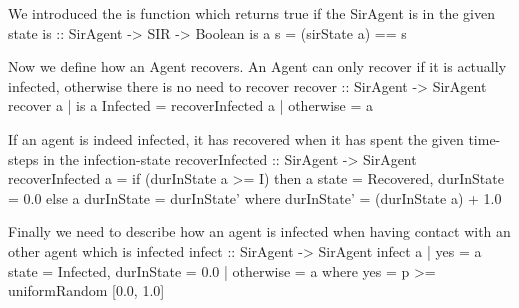 We introduced the is function which returns true if the SirAgent is in the given state
is :: SirAgent -> SIR -> Boolean
is a s = (sirState a) == s 

Now we define how an Agent recovers. An Agent can only recover if it is actually infected, otherwise there is no need to recover
recover :: SirAgent -> SirAgent
recover a 
	| is a Infected = recoverInfected a
	| otherwise 	= a
	
If an agent is indeed infected, it has recovered when it has spent the given time-steps in the infection-state
recoverInfected :: SirAgent -> SirAgent
recoverInfected a = if (durInState a >= I) then
						a { state = Recovered, durInState = 0.0 }
						else
							a { durInState = durInState' }
	where
		durInState' = (durInState a) + 1.0
		
	
Finally we need to describe how an agent is infected when having contact with an other agent which is infected
infect :: SirAgent -> SirAgent
infect a
	| yes = a {state = Infected, durInState = 0.0}
	| otherwise = a
		where
			yes = p >= uniformRandom [0.0, 1.0]